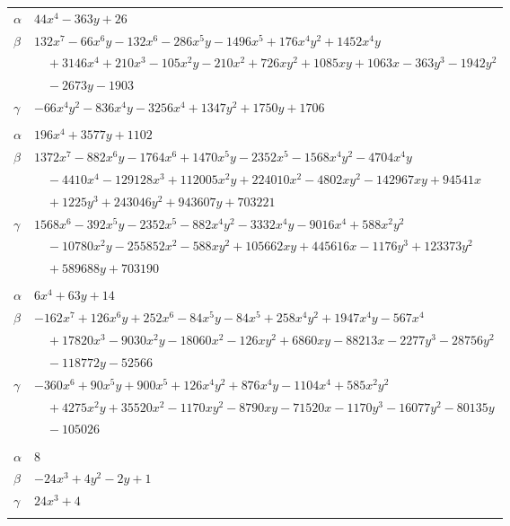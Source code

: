 \documentclass[11pt]{article}
\begin{document}
\begin{longtable}{@{}ll@{}}
$\alpha$ & $44x^{4}-363y+26$\\
$\beta$ & $132x^{7}-66x^{6}y-132x^{6}-286x^{5}y-1496x^{5}+176x^{4}y^{2}+1452x^{4}y$\\
 & $\quad +3146x^{4}+210x^{3}-105x^{2}y-210x^{2}+726xy^{2}+1085xy+1063x-363y^{3}-1942y^{2}$\\
 & $\quad -2673y-1903$\\
$\gamma$ & $-66x^{4}y^{2}-836x^{4}y-3256x^{4}+1347y^{2}+1750y+1706$\\
\addlinespace[3pt]
\multicolumn{2}{@{}l}{$\{i,j\}=\{11,104\}$, $k_{ij}=2^{4}\cdot 5\cdot 13$}\\
$\alpha$ & $196x^{4}+3577y+1102$\\
$\beta$ & $1372x^{7}-882x^{6}y-1764x^{6}+1470x^{5}y-2352x^{5}-1568x^{4}y^{2}-4704x^{4}y$\\
 & $\quad -4410x^{4}-129128x^{3}+112005x^{2}y+224010x^{2}-4802xy^{2}-142967xy+94541x$\\
 & $\quad +1225y^{3}+243046y^{2}+943607y+703221$\\
$\gamma$ & $1568x^{6}-392x^{5}y-2352x^{5}-882x^{4}y^{2}-3332x^{4}y-9016x^{4}+588x^{2}y^{2}$\\
 & $\quad -10780x^{2}y-255852x^{2}-588xy^{2}+105662xy+445616x-1176y^{3}+123373y^{2}$\\
 & $\quad +589688y+703190$\\
\addlinespace[3pt]
\multicolumn{2}{@{}l}{$\{i,j\}=\{11,106\}$, $k_{ij}=2^{3}\cdot 3\cdot 5$}\\
$\alpha$ & $6x^{4}+63y+14$\\
$\beta$ & $-162x^{7}+126x^{6}y+252x^{6}-84x^{5}y-84x^{5}+258x^{4}y^{2}+1947x^{4}y-567x^{4}$\\
 & $\quad +17820x^{3}-9030x^{2}y-18060x^{2}-126xy^{2}+6860xy-88213x-2277y^{3}-28756y^{2}$\\
 & $\quad -118772y-52566$\\
$\gamma$ & $-360x^{6}+90x^{5}y+900x^{5}+126x^{4}y^{2}+876x^{4}y-1104x^{4}+585x^{2}y^{2}$\\
 & $\quad +4275x^{2}y+35520x^{2}-1170xy^{2}-8790xy-71520x-1170y^{3}-16077y^{2}-80135y$\\
 & $\quad -105026$\\
\addlinespace[3pt]
\multicolumn{2}{@{}l}{$\{i,j\}=\{12,18\}$, $k_{ij}=3$}\\
$\alpha$ & $8$\\
$\beta$ & $-24x^{3}+4y^{2}-2y+1$\\
$\gamma$ & $24x^{3}+4$\\
\addlinespace[3pt]
\multicolumn{2}{@{}l}{$\{i,j\}=\{12,28\}$, $k_{ij}=5$}\\

\end{longtable}
\end{document}
